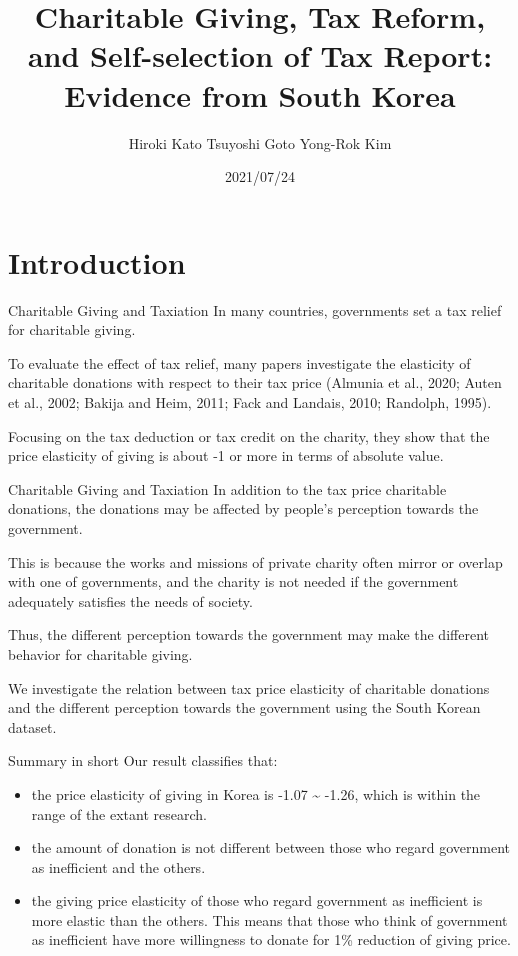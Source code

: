 \documentclass[
  ignorenonframetext,
  aspectratio=169]{beamer}
\title{Charitable Giving, Tax Reform, and Self-selection of Tax Report: Evidence from South Korea}
\author[shortname]{ Hiroki Kato  Tsuyoshi Goto  Yong-Rok Kim }
\date{2021/07/24}
\providecommand{\tightlist}{%
  \setlength{\itemsep}{0pt}\setlength{\parskip}{0pt}}
\begin{document}
\frame{\titlepage}

\hypertarget{introduction}{%
\section{Introduction}\label{introduction}}

\begin{frame}{Charitable Giving and Taxiation}
\protect\hypertarget{charitable-giving-and-taxiation}{}
In many countries, governments set a tax relief for charitable giving.

To evaluate the effect of tax relief, many papers investigate the elasticity of charitable donations with respect to their tax price (Almunia et al., 2020; Auten et al., 2002; Bakija and Heim, 2011; Fack and Landais, 2010; Randolph, 1995).

Focusing on the tax deduction or tax credit on the charity, they show that the price elasticity of giving is about -1 or more in terms of absolute value.
\end{frame}

\begin{frame}{Charitable Giving and Taxiation}
\protect\hypertarget{charitable-giving-and-taxiation-1}{}
In addition to the tax price charitable donations, the donations may be affected by people's perception towards the government.

This is because the works and missions of private charity often mirror or overlap with one of governments, and the charity is not needed if the government adequately satisfies the needs of society.

Thus, the different perception towards the government may make the different behavior for charitable giving.

We investigate the relation between tax price elasticity of charitable donations and the different perception towards the government using the South Korean dataset.
\end{frame}

\begin{frame}{Summary in short}
\protect\hypertarget{summary-in-short}{}
Our result classifies that:

\begin{itemize}
\tightlist
\item
  the price elasticity of giving in Korea is -1.07 \textasciitilde{} -1.26, which is within the range of the extant research.
\item
  the amount of donation is not different between those who regard government as inefficient and the others.
\item
  the giving price elasticity of those who regard government as inefficient is more elastic than the others. This means that those who think of government as inefficient have more willingness to donate for 1\% reduction of giving price.
\end{itemize}
\end{frame}
\end{document}

